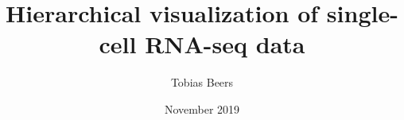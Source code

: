 \documentclass{article}
\title{Hierarchical visualization of single-cell RNA-seq data}
\author{Tobias Beers}
\date{November 2019}
\begin{document}
\glsaddall

\maketitle

\tableofcontents








\end{document}
